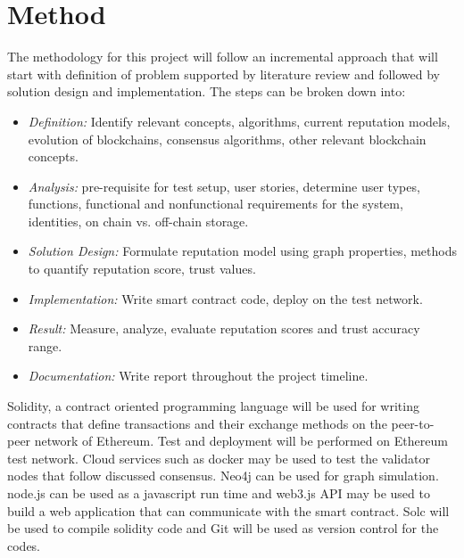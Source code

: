 \documentclass[a4paper,11pt,dvipsnames]{article}
\begin{document}
	\section*{Method}
	The methodology for this project will follow an incremental approach that 
	will start with definition of problem supported by literature review and 
	followed by solution design and implementation. The steps can be broken 
	down into: 
	\begin{itemize}
	  \item \textit{Definition:} Identify relevant concepts, algorithms, 
		current reputation models, evolution of blockchains, consensus 
		algorithms, other relevant blockchain concepts.
	  \item \textit{Analysis:} pre-requisite for test setup, user stories, 
		determine user types, functions, functional and nonfunctional 
		requirements for the system, identities, on chain vs. off-chain storage. 
	  \item \textit{Solution Design:} Formulate reputation model using graph 
		properties, methods to quantify reputation score, trust values.
	  \item \textit{Implementation:} Write smart contract code, deploy on the 
		test network. 
	  \item \textit{Result:} Measure, analyze, evaluate reputation scores and 
		trust accuracy range.
	  \item \textit{Documentation:} Write report throughout the project timeline.
	\end{itemize}
	Solidity, \cite{solidity} a contract oriented programming language will be 
	used for writing contracts that define transactions and their exchange 
	methods on the peer-to-peer network of Ethereum. \cite{ethereum_whitepaper} 
	Test and deployment will be performed on Ethereum test network. Cloud 
	services such as docker may be used to test the validator nodes that follow 
	discussed consensus. Neo4j can be used for graph simulation.
	node.js can be used as a javascript run time and web3.js API may be used 
	to build a web application that can communicate with the smart contract. 
	Solc will be used to compile solidity code and Git will be used as version 
	control for the codes.
	
\end{document}
